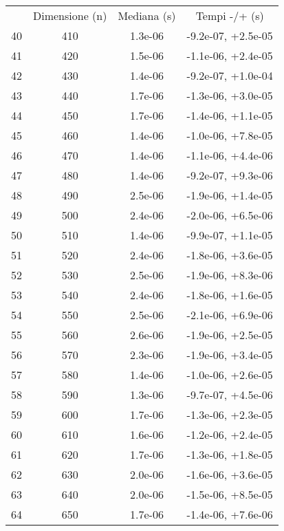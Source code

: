 \begin{table}
\centering
\begin{adjustbox}{width=1\textwidth/2}
\begin{tabular}{|c|c|c|c|}
\hline
 & Dimensione (n) & Mediana (s) & Tempi -/+ (s) \\
40 & 410 & 1.3e-06 & -9.2e-07, +2.5e-05 \\
\cline{1-4}
41 & 420 & 1.5e-06 & -1.1e-06, +2.4e-05 \\
\cline{1-4}
42 & 430 & 1.4e-06 & -9.2e-07, +1.0e-04 \\
\cline{1-4}
43 & 440 & 1.7e-06 & -1.3e-06, +3.0e-05 \\
\cline{1-4}
44 & 450 & 1.7e-06 & -1.4e-06, +1.1e-05 \\
\cline{1-4}
45 & 460 & 1.4e-06 & -1.0e-06, +7.8e-05 \\
\cline{1-4}
46 & 470 & 1.4e-06 & -1.1e-06, +4.4e-06 \\
\cline{1-4}
47 & 480 & 1.4e-06 & -9.2e-07, +9.3e-06 \\
\cline{1-4}
48 & 490 & 2.5e-06 & -1.9e-06, +1.4e-05 \\
\cline{1-4}
49 & 500 & 2.4e-06 & -2.0e-06, +6.5e-06 \\
\cline{1-4}
50 & 510 & 1.4e-06 & -9.9e-07, +1.1e-05 \\
\cline{1-4}
51 & 520 & 2.4e-06 & -1.8e-06, +3.6e-05 \\
\cline{1-4}
52 & 530 & 2.5e-06 & -1.9e-06, +8.3e-06 \\
\cline{1-4}
53 & 540 & 2.4e-06 & -1.8e-06, +1.6e-05 \\
\cline{1-4}
54 & 550 & 2.5e-06 & -2.1e-06, +6.9e-06 \\
\cline{1-4}
55 & 560 & 2.6e-06 & -1.9e-06, +2.5e-05 \\
\cline{1-4}
56 & 570 & 2.3e-06 & -1.9e-06, +3.4e-05 \\
\cline{1-4}
57 & 580 & 1.4e-06 & -1.0e-06, +2.6e-05 \\
\cline{1-4}
58 & 590 & 1.3e-06 & -9.7e-07, +4.5e-06 \\
\cline{1-4}
59 & 600 & 1.7e-06 & -1.3e-06, +2.3e-05 \\
\cline{1-4}
60 & 610 & 1.6e-06 & -1.2e-06, +2.4e-05 \\
\cline{1-4}
61 & 620 & 1.7e-06 & -1.3e-06, +1.8e-05 \\
\cline{1-4}
62 & 630 & 2.0e-06 & -1.6e-06, +3.6e-05 \\
\cline{1-4}
63 & 640 & 2.0e-06 & -1.5e-06, +8.5e-05 \\
\cline{1-4}
64 & 650 & 1.7e-06 & -1.4e-06, +7.6e-06 \\

\end{tabular}
\end{adjustbox}
\end{table}
